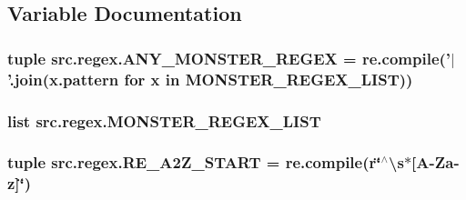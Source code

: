 \subsection{Variable Documentation}
\hypertarget{namespacesrc_1_1regex_a4b7cfef18aaf22683243447a59148dde}{
\subsubsection[{A\-N\-Y\-\_\-\-M\-O\-N\-S\-T\-E\-R\-\_\-\-R\-E\-G\-E\-X}]{\setlength{\rightskip}{0pt plus 5cm}tuple src.\-regex.\-A\-N\-Y\-\_\-\-M\-O\-N\-S\-T\-E\-R\-\_\-\-R\-E\-G\-E\-X = re.\-compile('$|$'.join(x.\-pattern for x in {\bf M\-O\-N\-S\-T\-E\-R\-\_\-\-R\-E\-G\-E\-X\-\_\-\-L\-I\-S\-T}))}}\label{namespacesrc_1_1regex_a4b7cfef18aaf22683243447a59148dde}
\hypertarget{namespacesrc_1_1regex_ab3d09d9623eb7271de1f52c2385bcc92}{
\subsubsection[{M\-O\-N\-S\-T\-E\-R\-\_\-\-R\-E\-G\-E\-X\-\_\-\-L\-I\-S\-T}]{\setlength{\rightskip}{0pt plus 5cm}list src.\-regex.\-M\-O\-N\-S\-T\-E\-R\-\_\-\-R\-E\-G\-E\-X\-\_\-\-L\-I\-S\-T}}\label{namespacesrc_1_1regex_ab3d09d9623eb7271de1f52c2385bcc92}
\hypertarget{namespacesrc_1_1regex_a37b9ab4c9ac518d64bf7b6fdaf351e31}{
\subsubsection[{R\-E\-\_\-\-A2\-Z\-\_\-\-S\-T\-A\-R\-T}]{\setlength{\rightskip}{0pt plus 5cm}tuple src.\-regex.\-R\-E\-\_\-\-A2\-Z\-\_\-\-S\-T\-A\-R\-T = re.\-compile(r\char`\"{}$^\wedge$\textbackslash{}s$\ast$\mbox{[}A-\/Za-\/z\mbox{]}\char`\"{})}}\label{namespacesrc_1_1regex_a37b9ab4c9ac518d64bf7b6fdaf351e31}
